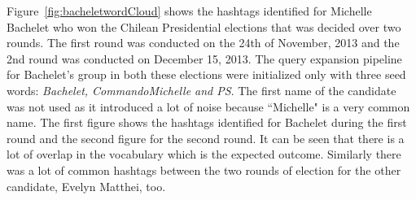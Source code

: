 Figure~\ref{fig:bacheletwordCloud} shows the hashtags identified for Michelle Bachelet who won the Chilean Presidential elections that was decided over two rounds.
The first round was conducted on the 24th of November, 2013 and the 2nd round was conducted on December 15, 2013. 
The query expansion pipeline for Bachelet's group in both these elections were initialized only with three seed words: {\it Bachelet, CommandoMichelle and PS}. 
The first name of the candidate was not used as it introduced a lot of noise because ``Michelle" is a very common name.
The first figure shows the hashtags identified for Bachelet during the first round and the second figure for the second round. 
It can be seen that there is a lot of overlap in the vocabulary which is the expected outcome. 
Similarly there was a lot of common hashtags between the two rounds of election for the other candidate, Evelyn Matthei, too.
	

